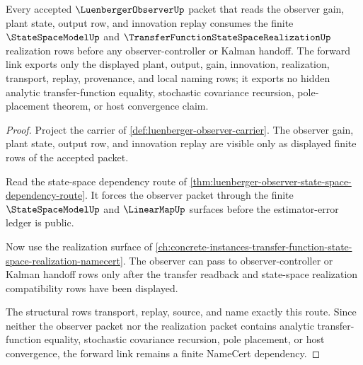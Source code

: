 \begin{theorem}
\label{thm:luenberger-observer-state-space-forward-link}
Every accepted $\LuenbergerObserverUp$ packet that reads the observer gain, plant state, output row, and innovation replay consumes the finite $\StateSpaceModelUp$ and $\TransferFunctionStateSpaceRealizationUp$ realization rows before any observer-controller or Kalman handoff. The forward link exports only the displayed plant, output, gain, innovation, realization, transport, replay, provenance, and local naming rows; it exports no hidden analytic transfer-function equality, stochastic covariance recursion, pole-placement theorem, or host convergence claim.
\end{theorem}
\begin{proof}
Project the carrier of \autoref{def:luenberger-observer-carrier}. The observer gain, plant state, output row, and innovation replay are visible only as displayed finite rows of the accepted packet.

Read the state-space dependency route of \autoref{thm:luenberger-observer-state-space-dependency-route}. It forces the observer packet through the finite $\StateSpaceModelUp$ and $\LinearMapUp$ surfaces before the estimator-error ledger is public.

Now use the realization surface of \autoref{ch:concrete-instances-transfer-function-state-space-realization-namecert}. The observer can pass to observer-controller or Kalman handoff rows only after the transfer readback and state-space realization compatibility rows have been displayed.

The structural rows transport, replay, source, and name exactly this route. Since neither the observer packet nor the realization packet contains analytic transfer-function equality, stochastic covariance recursion, pole placement, or host convergence, the forward link remains a finite NameCert dependency.
\end{proof}
